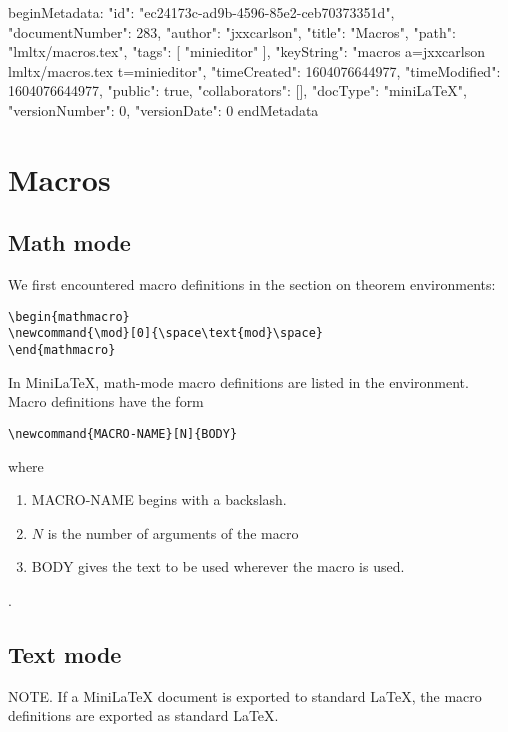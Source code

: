 beginMetadata:
{
    "id": "ec24173c-ad9b-4596-85e2-ceb70373351d",
    "documentNumber": 283,
    "author": "jxxcarlson",
    "title": "Macros",
    "path": "lmltx/macros.tex",
    "tags": [
        "minieditor"
    ],
    "keyString": "macros a=jxxcarlson lmltx/macros.tex t=minieditor",
    "timeCreated": 1604076644977,
    "timeModified": 1604076644977,
    "public": true,
    "collaborators": [],
    "docType": "miniLaTeX",
    "versionNumber": 0,
    "versionDate": 0
}
endMetadata

\setcounter{section}{8}

\section{Macros}

\innertableofcontents


\subsection{Math mode}

We first encountered macro definitions in the section on theorem environments:



\begin{verbatim}
\begin{mathmacro}
\newcommand{\mod}[0]{\space\text{mod}\space}
\end{mathmacro}
\end{verbatim}

In MiniLaTeX, math-mode macro definitions are listed in the  environment.
Macro definitions have the form

 \begin{verbatim}
\newcommand{MACRO-NAME}[N]{BODY}\end{verbatim}

where 


\begin{enumerate}

\item MACRO-NAME begins with a backslash.

\item  $N$ is the number of arguments of the macro

\item BODY gives  the text to be used wherever the macro is used.

\end{enumerate}
. 
\subsection{Text mode}

NOTE. If a MiniLaTeX document is exported  to standard LaTeX, the macro definitions are exported as standard LaTeX.
